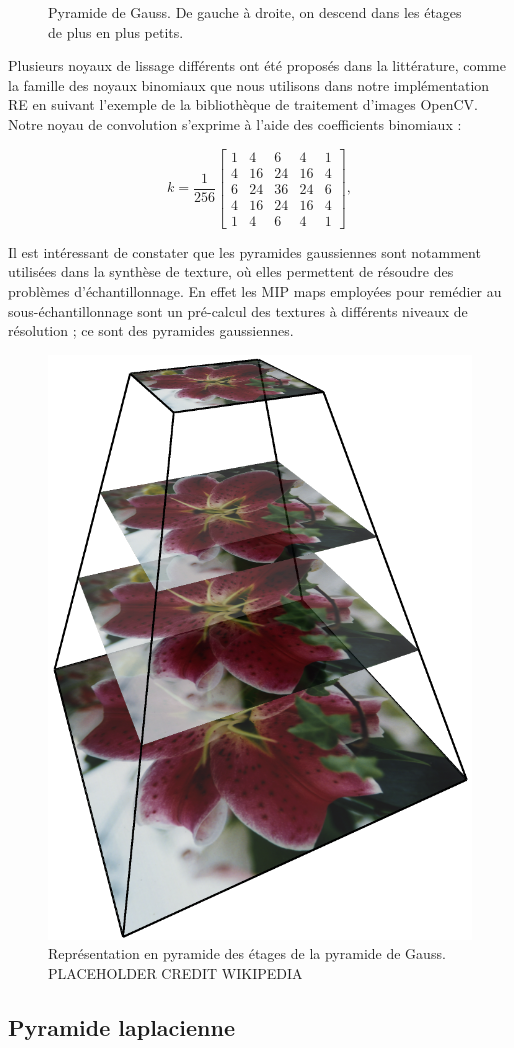 \begin{figure}[h]
    \caption[Pyramide de Gauss]{Pyramide de Gauss. De gauche à droite, on descend dans les étages de plus en plus petits.}
    \label{fig:gaussian-pyramid}
\end{figure}

Plusieurs noyaux de lissage différents ont été proposés dans la littérature, comme la famille des noyaux binomiaux que nous utilisons dans notre implémentation RE en suivant l'exemple de la bibliothèque de traitement d'images OpenCV. Notre noyau de convolution s'exprime à l'aide des coefficients binomiaux :

\begin{equation}
    k = \frac{1}{256}\left[
        \begin{array}{ccccccc}
            1 & 4 & 6 & 4 & 1 \\
            4 & 16 & 24 & 16 & 4 \\
            6 & 24 & 36 & 24 & 6 \\
            4 & 16 & 24 & 16 & 4 \\
            1 & 4 & 6 & 4 & 1
        \end{array}
    \right],
\end{equation}

Il est intéressant de constater que les pyramides gaussiennes sont notamment utilisées dans la synthèse de texture, où elles permettent de résoudre des problèmes d'échantillonnage. En effet les MIP maps employées pour remédier au sous-échantillonnage sont un pré-calcul des textures à différents niveaux de résolution ; ce sont des pyramides gaussiennes.

\begin{figure}
    \centering
    \includegraphics[width=.25\textwidth]{contenu/resources/images/image_pyramid_placeholder}
    \caption[Représentation pyramidale des étages de la pyramide de Gauss]{Représentation en pyramide des étages de la pyramide de Gauss. {\color{red}PLACEHOLDER CREDIT WIKIPEDIA}}
    \label{fig:pyramid-gauss}
\end{figure}

\subsection{Pyramide laplacienne}

